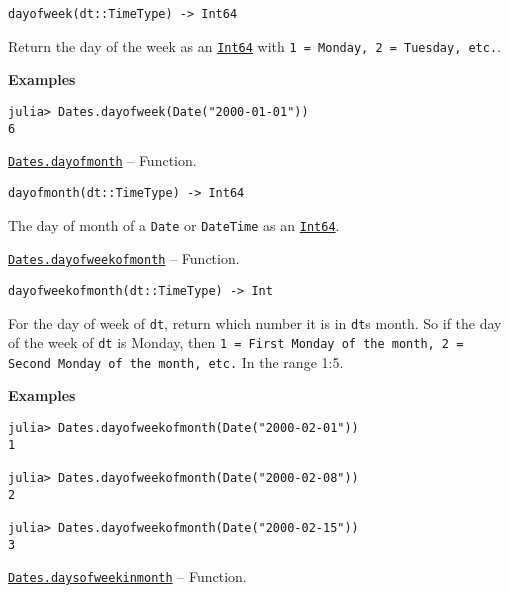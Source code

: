 \begin{adjustwidth}{2em}{0pt}


\begin{verbatim}
dayofweek(dt::TimeType) -> Int64
\end{verbatim}

Return the day of the week as an \hyperlink{7720564657383125058}{\texttt{Int64}} with \texttt{1 = Monday, 2 = Tuesday, etc.}.

\textbf{Examples}


\begin{verbatim}
julia> Dates.dayofweek(Date("2000-01-01"))
6
\end{verbatim}



\end{adjustwidth}
\hypertarget{11391658730748043877}{} 
\hyperlink{11391658730748043877}{\texttt{Dates.dayofmonth}}  -- {Function.}

\begin{adjustwidth}{2em}{0pt}


\begin{verbatim}
dayofmonth(dt::TimeType) -> Int64
\end{verbatim}

The day of month of a \texttt{Date} or \texttt{DateTime} as an \hyperlink{7720564657383125058}{\texttt{Int64}}.



\end{adjustwidth}
\hypertarget{3444497056704321071}{} 
\hyperlink{3444497056704321071}{\texttt{Dates.dayofweekofmonth}}  -- {Function.}

\begin{adjustwidth}{2em}{0pt}


\begin{verbatim}
dayofweekofmonth(dt::TimeType) -> Int
\end{verbatim}

For the day of week of \texttt{dt}, return which number it is in \texttt{dt}{\textquotesingle}s month. So if the day of the week of \texttt{dt} is Monday, then \texttt{1 = First Monday of the month, 2 = Second Monday of the month, etc.} In the range 1:5.

\textbf{Examples}


\begin{verbatim}
julia> Dates.dayofweekofmonth(Date("2000-02-01"))
1

julia> Dates.dayofweekofmonth(Date("2000-02-08"))
2

julia> Dates.dayofweekofmonth(Date("2000-02-15"))
3
\end{verbatim}



\end{adjustwidth}
\hypertarget{3276636057341185884}{} 
\hyperlink{3276636057341185884}{\texttt{Dates.daysofweekinmonth}}  -- {Function.}

